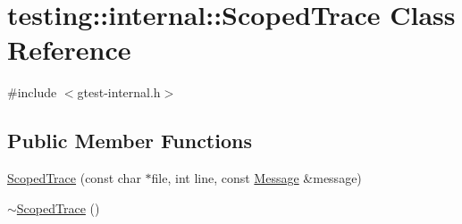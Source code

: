 \hypertarget{classtesting_1_1internal_1_1_scoped_trace}{\section{testing\+:\+:internal\+:\+:Scoped\+Trace Class Reference}
\label{classtesting_1_1internal_1_1_scoped_trace}
}


{\ttfamily \#include $<$gtest-\/internal.\+h$>$}

\subsection*{Public Member Functions}
\begin{DoxyCompactItemize}
\item 
\hyperlink{classtesting_1_1internal_1_1_scoped_trace_ab965d7010bbbc82c1bef6ebf8748bede}{Scoped\+Trace} (const char $\ast$file, int line, const \hyperlink{classtesting_1_1_message}{Message} \&message)
\item 
\hyperlink{classtesting_1_1internal_1_1_scoped_trace_a658c7c098ff48337058bfa2ccab65881}{$\sim$\+Scoped\+Trace} ()
\end{DoxyCompactItemize}


